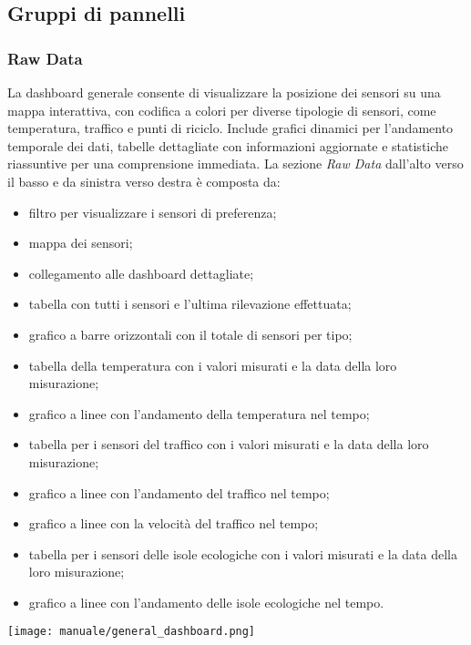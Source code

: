 \subsection{Gruppi di pannelli}
\subsubsection{Raw Data}
La dashboard generale consente di visualizzare la posizione dei sensori su una mappa interattiva, con codifica a colori per diverse tipologie di sensori, come temperatura, traffico e punti di riciclo. Include grafici dinamici per l'andamento temporale dei dati, tabelle dettagliate con informazioni aggiornate e statistiche riassuntive per una comprensione immediata. La sezione \textit{Raw Data} dall'alto verso il basso e da sinistra verso destra è composta da:
\begin{itemize}
    \item filtro per visualizzare i sensori di preferenza;
    \item mappa dei sensori;
    \item collegamento alle dashboard dettagliate;
    \item tabella con tutti i sensori e l'ultima rilevazione effettuata;
    \item grafico a barre orizzontali con il totale di sensori per tipo;
    \item tabella della temperatura con i valori misurati e la data della loro misurazione;
    \item grafico a linee con l'andamento della temperatura nel tempo;
    \item tabella per i sensori del traffico con i valori misurati e la data della loro misurazione;
    \item grafico a linee con l'andamento del traffico nel tempo;
    \item grafico a linee con la velocità del traffico nel tempo;
    \item tabella per i sensori delle isole ecologiche con i valori misurati e la data della loro misurazione;
    \item grafico a linee con l'andamento delle isole ecologiche nel tempo.
\end{itemize}
\begin{center}
    \texttt{[image: manuale/general\_dashboard.png]}
\end{center}

\newpage
